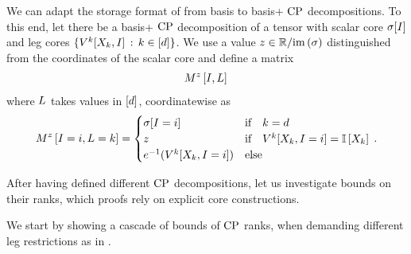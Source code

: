 \begin{remark}
    \label{rem:matStorageBasPlus}
    We can adapt the storage format of  from basis to basis+ $\mathrm{CP}$ decompositions.
    To this end, let there be a basis+ $\mathrm{CP}$ decomposition of a tensor with scalar core $\sigma[I]$ and leg cores $\{V^{k}[X_{k},I] \, : \, k\in[d]\}$.
    We use a value $z\in\mathbb{R}/\mathrm{im}\left(\sigma\right)$ distinguished from the coordinates of the scalar core and define a matrix
    \begin{align*}
        M^{z}\left[I,L\right] \,
    \end{align*}
    where $L$ takes values in $[d]$, coordinatewise as
    \begin{align*}
        M^{z}\left[I=i,L=k\right] =
        \begin{cases}
            \sigma[I=i] & \text{if} \quad k = d \\
            z & \text{if} \quad V^{k}[X_{k},I=i] = \mathbb{I}\left[X_{k}\right] \\
            e^{-1}(V^{k}[X_{k},I=i]) & \text{else}
        \end{cases} \, .
    \end{align*}
\end{remark}




After having defined different $\mathrm{CP}$ decompositions, let us investigate bounds on their ranks, which proofs rely on explicit core constructions.




We start by showing a cascade of bounds of $\mathrm{CP}$ ranks, when demanding different leg restrictions as in .

